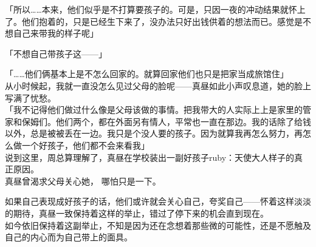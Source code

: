 「所以……本来，他们似乎是不打算要孩子的。可是，只因一夜的冲动结果就怀上了。他们抱着的，只是已经生下来了，没办法只好出钱供着的想法而已。感觉是不想自己来带我的样子呢」

「不想自己带孩子这——」

「……他们俩基本上是不怎么回家的。就算回家他们也只是把家当成旅馆住」\\

从小时候起，我就一直没怎么见过父母的脸呢——真昼如此小声叹息道，她的脸上写满了忧愁。\\

「我不记得他们做过什么像是父母该做的事情。把我带大的人实际上上是家里的管家和保姆们。他们两个，都在外面另有情人，平常也一直在那边。我的话除了给钱以外，总是被被丢在一边。我只是个没人要的孩子。因为就算我再怎么努力，再怎么做一个好孩子，他们都不会来看我」\\

说到这里，周总算理解了，真昼在学校装出一副好孩子{ruby：天使大人}样子的真正原因。\\

真昼曾渴求父母关心她， 哪怕只是一下。

如果自己表现成好孩子的话，他们或许就会关心自己，夸奖自己——怀着这样淡淡的期待，真昼一致保持着这样的举止，错过了停下来的机会直到现在。\\

如今依旧保持着这副举止，不知是因为还在念想着那些微的可能性，还是不愿触及自己的内心而为自己带上的面具。

